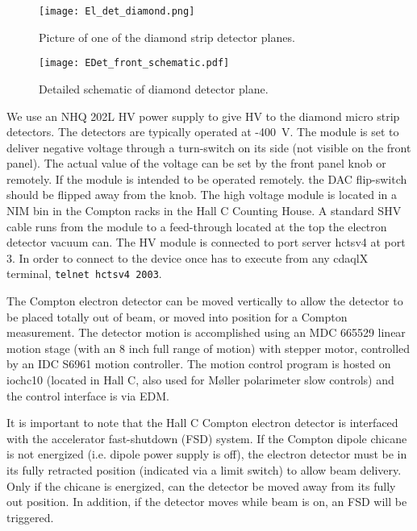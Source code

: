 {\begin{figure}[htp]
\begin{center}
\texttt{[image: El\_det\_diamond.png]}
\caption{Picture of one of the diamond strip detector planes.\label{fig:edet_photo}}
\end{center}
\end{figure}

\begin{figure}[htp]
\begin{center}
\texttt{[image: EDet\_front\_schematic.pdf]}
\caption{Detailed schematic of diamond detector plane.\label{fig:edet_schematic}}
\end{center}
\end{figure}

We use an NHQ 202L HV power supply to give HV to the diamond micro strip detectors. The detectors are
typically operated at -400~V. The module is set to deliver negative voltage through a turn-switch on its side
(not visible on the front panel). The actual value of the voltage can be set by the front panel knob or
remotely. If the module is intended to be operated remotely. the DAC flip-switch should be flipped away from
the knob. The high voltage module is located in a NIM bin in the Compton racks in the Hall C Counting House.
A standard SHV cable runs from the module to a feed-through located at the top the electron detector
vacuum can. The HV module is connected to port server hctsv4 at port 3. In order to connect to the device
once has to execute from any cdaqlX terminal, \texttt{telnet hctsv4 2003}.

The Compton electron detector can be moved vertically to allow the detector to be placed totally out of beam,
or moved into position for a Compton measurement. The detector motion is accomplished using an MDC 665529
linear motion stage (with an 8 inch full range of motion) with stepper motor, controlled by an IDC S6961
motion controller.  The motion control program is hosted on iochc10 (located in Hall C, also used for
M\o ller polarimeter slow controls) and the control interface is via EDM.

It is important to note that the Hall C Compton electron detector is interfaced with the accelerator
fast-shutdown (FSD) system. If the Compton dipole chicane is not energized (i.e. dipole power supply is off),
the electron detector must be in its fully retracted position (indicated via a limit switch) to allow
beam delivery. Only if the chicane is energized, can the detector be moved away from its fully out
position. In addition, if the detector moves while beam is on, an FSD will be triggered.

}
